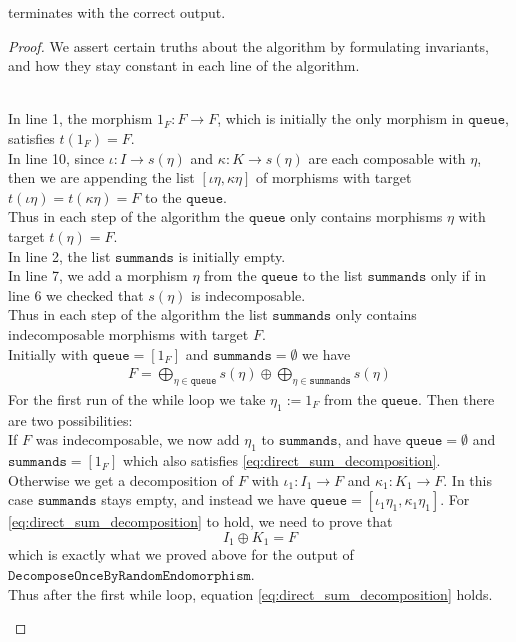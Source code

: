 \begin{proposition}
 terminates with the correct output.
\end{proposition}
\begin{proof} We assert certain truths about the algorithm by formulating invariants, and how they stay constant in each line of the algorithm.\\

\begin{subproof}\phantom{}\\
\noindent In line 1, the morphism $1_{F} : F \rightarrow F$, which is initially the only morphism in $\mathtt{queue}$, satisfies $t(1_{F}) = F$.\\
In line 10, since $\iota : I \rightarrow s(\eta)$ and $\kappa : K \rightarrow s(\eta)$ are each composable with $\eta$, then we are
appending the list $[\iota\eta, \kappa\eta]$ of morphisms with target $t(\iota\eta) = t(\kappa\eta) = F$ to the $\mathtt{queue}$.\\
Thus in each step of the algorithm the $\mathtt{queue}$ only contains morphisms $\eta$ with target $t(\eta) = F$.\\

\noindent In line 2, the list $\mathtt{summands}$ is initially empty.\\
In line 7, we add a morphism $\eta$ from the $\mathtt{queue}$ to the list $\mathtt{summands}$ only if
in line 6 we checked that $s(\eta)$ is indecomposable.\\
Thus in each step of the algorithm the list $\mathtt{summands}$ only contains indecomposable morphisms with target $F$.\\

\noindent Initially with $\mathtt{queue} = [1_{F}]$ and $\mathtt{summands} = \emptyset$ we have
\begin{align}
F = \label{eq:direct_sum_decomposition}
\bigoplus_{\eta \in \mathtt{queue}} s(\eta) \oplus \bigoplus_{\eta \in \mathtt{summands}} s(\eta)
\end{align}
For the first run of the while loop we take $\eta_{1} := 1_{F}$ from the $\mathtt{queue}$. Then there are two possibilities:\\
If $F$ was indecomposable, we now add $\eta_{1}$ to $\mathtt{summands}$, and have $\mathtt{queue} = \emptyset$ and
$\mathtt{summands} = [1_{F}]$ which also satisfies \eqref{eq:direct_sum_decomposition}.\\
Otherwise we get a decomposition of $F$ with $\iota_{1} : I_{1} \rightarrow F$ and $\kappa_{1} : K_{1} \rightarrow F$. In this case
$\mathtt{summands}$ stays empty, and instead we have $\mathtt{queue} = [\iota_{1}\eta_{1}, \kappa_{1}\eta_{1}]$. For
\eqref{eq:direct_sum_decomposition} to hold, we need to prove that
\[
I_{1} \oplus K_{1} = F
\]
which is exactly what we proved above for the output of $\mathtt{DecomposeOnceByRandomEndomorphism}$.\\
Thus after the first while loop, equation \eqref{eq:direct_sum_decomposition} holds.\\


\end{subproof}
\end{proof}

